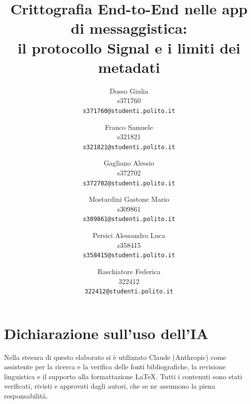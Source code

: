 \documentclass[10pt,twocolumn,letterpaper]{article}
\title{Crittografia End-to-End nelle app di messaggistica:\\
il protocollo Signal e i limiti dei metadati}
\author{
Dosso Giulia\\
s371760\\
{\tt\small s371760@studenti.polito.it}
\and
Franco Samuele\\
s321821\\
{\tt\small s321821@studenti.polito.it}
\and
Gagliano Alessio\\
s372702\\
{\tt\small s372702@studenti.polito.it}
\and
Mostardini Gastone Mario\\
s309861\\
{\tt\small s309861@studenti.polito.it}
\and
Persici Alessandro Luca\\
s358415\\
{\tt\small s358415@studenti.polito.it}
\and
Raschiatore Federica\\
322412\\
{\tt\small 322412@studenti.polito.it}
}
\begin{document}
\onecolumn
\maketitle
\tableofcontents
\vspace{15pt}
\twocolumn







\section*{Dichiarazione sull'uso dell'IA}
Nella stesura di questo elaborato si è utilizzato Claude (Anthropic) come assistente
per la ricerca e la verifica delle fonti bibliografiche, la revisione linguistica e il
supporto alla formattazione \LaTeX{}. Tutti i contenuti sono stati verificati,
rivisti e approvati dagli autori, che se ne assumono la piena responsabilità.
{
    \small
    
    
}

% 
\end{document}
